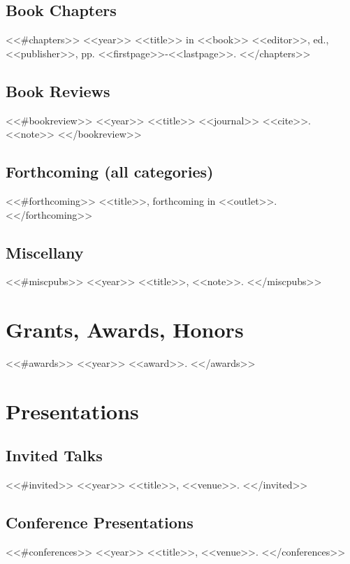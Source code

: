 \documentclass[letterpaper]{moderncv}
\begin{document}
\subsection{Book Chapters}
<<#chapters>>
\cventry
{<<year>>}
{<<title>>}
{}
{in <<book>>}
{}
{<<editor>>, ed., <<publisher>>, pp. <<firstpage>>-<<lastpage>>.}
\vspace{1mm}
<</chapters>>
\vspace{1mm}

\subsection{Book Reviews}
<<#bookreview>>
\cventry
{<<year>>}
{<<title>>}
{}
{<<journal>>}
{}
{<<cite>>. <<note>>}
\vspace{1mm}
<</bookreview>>
\vspace{1mm}

\subsection{Forthcoming (all categories)}
<<#forthcoming>>
\cvitem
{}
{<<title>>, forthcoming in <<outlet>>.}
\vspace{1mm}
<</forthcoming>>

\subsection{Miscellany}
<<#miscpubs>>
\cvitem
{<<year>>}
{<<title>>, <<note>>.}
\vspace{1mm}
<</miscpubs>>


\section{Grants, Awards, Honors}
<<#awards>>
\cvitem
{<<year>>}
{<<award>>.}
\vspace{1mm}
<</awards>>


\section{Presentations}
\subsection{Invited Talks}
<<#invited>>
\cvitem
{<<year>>}
{<<title>>, <<venue>>.}
\vspace{1mm}
<</invited>>
\subsection{Conference Presentations}
<<#conferences>>
\cvitem
{<<year>>}
{<<title>>, <<venue>>.}
\vspace{1mm}
<</conferences>>
\end{document}
